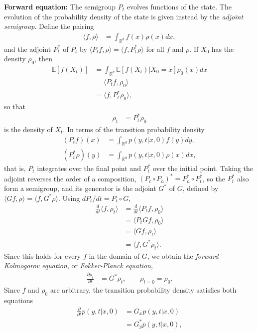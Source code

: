 \documentclass[11pt]{article}
\begin{document}
{\bf Forward equation:} The semigroup $P_t$ evolves functions of the state. The evolution of the probability density of the state is given instead by the {\it adjoint semigroup}. Define the pairing
\begin{align}
  \langle f,\rho\rangle&=\int_{\mathbb{R}^d}f(x)\rho(x)dx,
\end{align}
and the adjoint $P_t^*$ of $P_t$ by $\langle P_tf,\rho\rangle=\langle f,P_t^*\rho\rangle$ for all $f$ and $\rho$. If $X_0$ has the density $\rho_0$, then
\begin{align}
  \mathbb{E}[f(X_t)]&=\int_{\mathbb{R}^d}\mathbb{E}[f(X_t)|X_0=x]\rho_0(x)dx\nonumber\\
  &=\langle P_tf,\rho_0\rangle\nonumber\\
  &=\langle f,P_t^*\rho_0\rangle,
\end{align}
so that
\begin{align}
  \rho_t&=P_t^*\rho_0
\end{align}
is the density of $X_t$. In terms of the transition probability density
\begin{align}
  (P_tf)(x)&=\int_{\mathbb{R}^d}p(y,t|x,0)f(y)dy,\nonumber\\
  (P_t^*\rho)(y)&=\int_{\mathbb{R}^d}p(y,t|x,0)\rho(x)dx,
\end{align}
that is, $P_t$ integrates over the final point and $P_t^*$ over the initial point. Taking the adjoint reverses the order of a composition, $(P_t\circ P_h)^*=P_h^*\circ P_t^*$, so the $P_t^*$ also form a semigroup, and its generator is the adjoint $G^*$ of $G$, defined by $\langle Gf,\rho\rangle=\langle f,G^*\rho\rangle$. Using $dP_t/dt=P_t\circ G$,
\begin{align}
  \frac{d}{dt}\langle f,\rho_t\rangle&=\frac{d}{dt}\langle P_tf,\rho_0\rangle\nonumber\\
  &=\langle P_tGf,\rho_0\rangle\nonumber\\
  &=\langle Gf,\rho_t\rangle\nonumber\\
  &=\langle f,G^*\rho_t\rangle.
\end{align}
Since this holds for every $f$ in the domain of $G$, we obtain the {\it forward Kolmogorov equation}, or {\it Fokker-Planck equation},
\begin{align}
  \frac{\partial\rho_t}{\partial t}&=G^*\rho_t,\qquad \rho_{t=0}=\rho_0.
\end{align}
Since $f$ and $\rho_0$ are arbitrary, the transition probability density satisfies both equations
\begin{align}
  \frac{\partial}{\partial t}p(y,t|x,0)&=G_xp(y,t|x,0)\nonumber\\
  &=G^*_yp(y,t|x,0),
\end{align}
\end{document}
